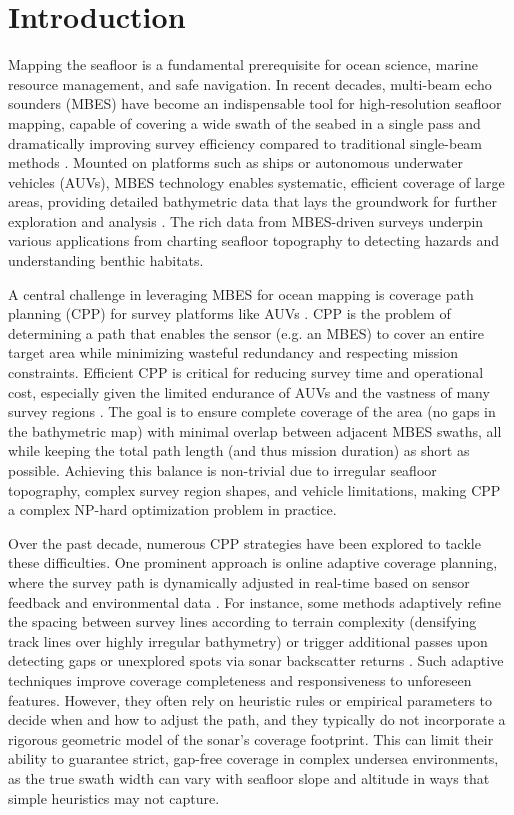 \documentclass[compress]{cm}
\begin{document}
\section{Introduction}
Mapping the seafloor is a fundamental prerequisite for ocean science, marine resource management, and safe navigation. In recent decades, multi-beam echo sounders (MBES) have become an indispensable tool for high-resolution seafloor mapping, capable of covering a wide swath of the seabed in a single pass and dramatically improving survey efficiency compared to traditional single-beam methods \cite{shi2020data, yordanova2020coverage}. Mounted on platforms such as ships or autonomous underwater vehicles (AUVs), MBES technology enables systematic, efficient coverage of large areas, providing detailed bathymetric data that lays the groundwork for further exploration and analysis \cite{shi2020data, yordanova2020coverage}. The rich data from MBES-driven surveys underpin various applications from charting seafloor topography to detecting hazards and understanding benthic habitats.

A central challenge in leveraging MBES for ocean mapping is coverage path planning (CPP) for survey platforms like AUVs \cite{li2024multi, zhang2022online, yan2024dual}. CPP is the problem of determining a path that enables the sensor (e.g. an MBES) to cover an entire target area while minimizing wasteful redundancy and respecting mission constraints. Efficient CPP is critical for reducing survey time and operational cost, especially given the limited endurance of AUVs and the vastness of many survey regions \cite{li2024multi, zhang2022online, yan2024dual}. The goal is to ensure complete coverage of the area (no gaps in the bathymetric map) with minimal overlap between adjacent MBES swaths, all while keeping the total path length (and thus mission duration) as short as possible. Achieving this balance is non-trivial due to irregular seafloor topography, complex survey region shapes, and vehicle limitations, making CPP a complex NP-hard optimization problem in practice.

Over the past decade, numerous CPP strategies have been explored to tackle these difficulties. One prominent approach is online adaptive coverage planning, where the survey path is dynamically adjusted in real-time based on sensor feedback and environmental data \cite{xie2024three, li2024full, ji2022multi, wu2024complete}. For instance, some methods adaptively refine the spacing between survey lines according to terrain complexity (densifying track lines over highly irregular bathymetry) or trigger additional passes upon detecting gaps or unexplored spots via sonar backscatter returns \cite{xie2024three, li2024full, ji2022multi, wu2024complete}. Such adaptive techniques improve coverage completeness and responsiveness to unforeseen features. However, they often rely on heuristic rules or empirical parameters to decide when and how to adjust the path, and they typically do not incorporate a rigorous geometric model of the sonar’s coverage footprint. This can limit their ability to guarantee strict, gap-free coverage in complex undersea environments, as the true swath width can vary with seafloor slope and altitude in ways that simple heuristics may not capture.
\end{document}
